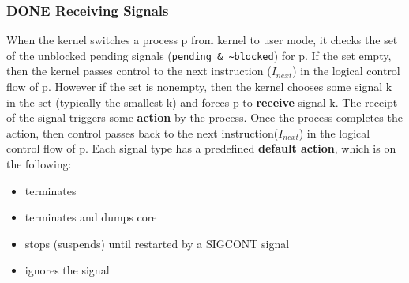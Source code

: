 \documentclass[11pt]{article}
\begin{document}
\subsubsection{{\bfseries\sffamily DONE} Receiving Signals}
\label{sec:orga95e696}
When the kernel switches a process p from kernel to user mode, it checks the set of the unblocked pending signals (\texttt{pending \& \textasciitilde{}blocked}) for p. If the set empty, then the kernel passes control to the next instruction (\(I_{next}\)) in the logical control flow of p. However if the set is nonempty, then the kernel chooses some signal k in the set (typically the smallest k) and forces p to \textbf{receive} signal k. The receipt of the signal triggers some \textbf{action} by the process. Once the process completes the action, then control passes back to the next instruction(\(I_{next}\)) in the logical control flow of p. Each signal type has a predefined \textbf{default action}, which is on the following:\\
\begin{itemize}
\item terminates\\
\item terminates and dumps core\\
\item stops (suspends) until restarted by a SIGCONT signal\\
\item ignores the signal\\
\end{itemize}
\end{document}
